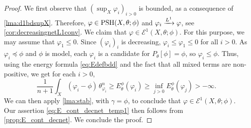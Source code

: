 \begin{proof}
    We first observe that $(\sup_X \varphi_i)_{i>0}$ is bounded, as a consequence of \cref{lma:d1bdsupX}. Therefore, $\varphi\in \mathrm{PSH}(X,\theta;\phi)$ and $\varphi_i\xrightarrow[]{L^1} \varphi$, see \cref{cor:decreasingnetL1conv}. We claim that $\varphi\in \mathcal{E}^1(X,\theta;\phi)$. For this purpose, we may assume that $\varphi_1\leq 0$.
    Since $(\varphi_i)_i$ is decreasing, $\varphi_i\leq \varphi_1\leq 0$ for all $i>0$. As $\varphi_i\preceq\phi$ and $\phi$ is model, each $\varphi_i$ is a candidate for $P_\theta[\phi]=\phi$, so $\varphi_i\leq \phi$. Thus, using the energy formula \eqref{eq:Edefbdd} and the fact that all mixed terms are non-positive, we get for each $i>0$,
    \[
        \frac{1}{n+1}\int_X \left(\varphi_i-\phi\right)\,\theta_{\varphi_i}^n\geq E_{\theta}^{\phi}(\varphi_i)\geq \inf_{j>0} E_{\theta}^{\phi}(\varphi_j)>-\infty.
    \]
    We can then apply \cref{lma:stab}, with $\gamma=\phi$, to conclude that $\varphi\in \mathcal{E}^1(X,\theta;\phi)$.
    Our assertion \eqref{eq:E_cont_decnet_temp1} then follows from \cref{prop:E_cont_decnet}. We conclude the proof.
\end{proof}

